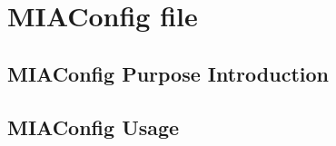 \chapter{MIAConfig file} \label{MIAConfig}
\pagestyle{fancy}

\section{MIAConfig Purpose Introduction}

\section{MIAConfig Usage}


